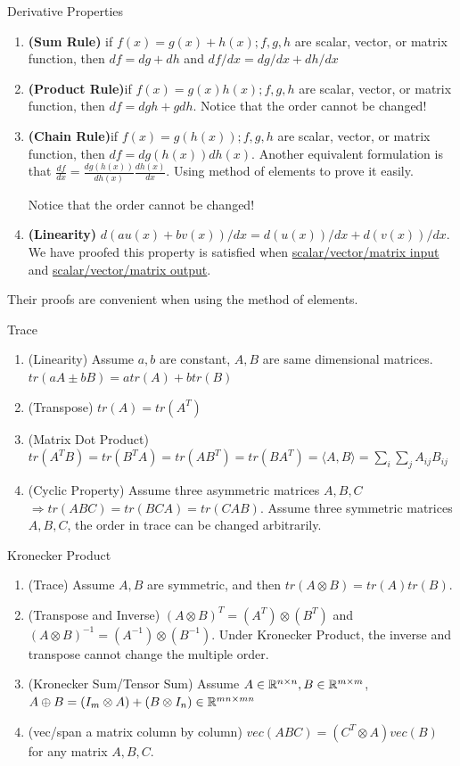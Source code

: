 		\begin{Properties}{Derivative Properties}{}
			
			\begin{enumerate}
				\item \textbf{(Sum Rule)} if $f(x)=g(x)+h(x);f,g,h$ are scalar, vector, or matrix function, then $df=dg+dh$ and $df/dx=dg/dx+dh/dx$
				\item \textbf{(Product Rule)}if $f(x)=g(x)h(x);f,g,h$ are scalar, vector, or matrix function, then $df=dgh+gdh$. Notice that the order cannot be changed!
				\item \textbf{(Chain Rule)}if $f(x)=g(h(x));f,g,h$ are scalar, vector, or matrix function, then $df=dg(h(x))dh(x)$. Another equivalent formulation is that $\frac{df}{dx}=\frac{dg(h(x))}{dh(x)}\frac{dh(x)}{dx}$. Using method of elements to prove it easily. 
				
				Notice that the order cannot be changed!
				\item \textbf{(Linearity)} $d(au(x)+bv(x))/{dx} =d(u(x))/dx+d(v(x))/dx$. We have proofed this property is satisfied when \underline{scalar/vector/matrix input} and \underline{scalar/vector/matrix output}.
			\end{enumerate}
		Their proofs are convenient when using the method of elements.
		\end{Properties}
	
		\begin{Properties}{Trace}{}
			\begin{enumerate}
				\item (Linearity) Assume $a,b$ are constant, $A,B$ are same dimensional matrices. $tr(aA\pm bB)=atr(A)+btr(B)$
				\item (Transpose) $tr(A) = tr(A^T)$
				\item (Matrix Dot Product) $tr(A^TB)=tr(B^TA)=tr(AB^T)=tr(BA^T)=\langle A,B\rangle = \sum_{i}\sum_{j}A_{ij}B_{ij}$
				\item (Cyclic Property) Assume three asymmetric matrices $A,B,C$ $\Rightarrow tr(ABC)=tr(BCA)=tr(CAB)$. Assume three symmetric matrices $A,B,C$, the order in trace can be changed arbitrarily.
			\end{enumerate}
		\end{Properties}
	
		\begin{Properties}{Kronecker Product}{}
			
			\begin{enumerate}
				\item (Trace) Assume $A,B$ are symmetric, and then $tr(A\otimes B)=tr(A)tr(B)$.
				\item (Transpose and Inverse) $(A\otimes B)^T=(A^T)\otimes(B^T)$ and $(A\otimes B)^{-1}=(A^{-1})\otimes(B^{-1})$. Under Kronecker Product, the inverse and transpose cannot change the multiple order.
				\item (Kronecker Sum/Tensor Sum) Assume $A\in \mathbb{R}^{n\times n},B\in \mathbb{R}^{m\times m}$, $A\oplus B=(I_m\otimes A)+(B\otimes I_n)\in\mathbb{R}^{mn\times mn}$
				\item (vec/span a matrix column by column) $vec(ABC)=(C^T\otimes A)vec(B)$ for any matrix $A,B,C$.
			\end{enumerate}
		\end{Properties}
	
